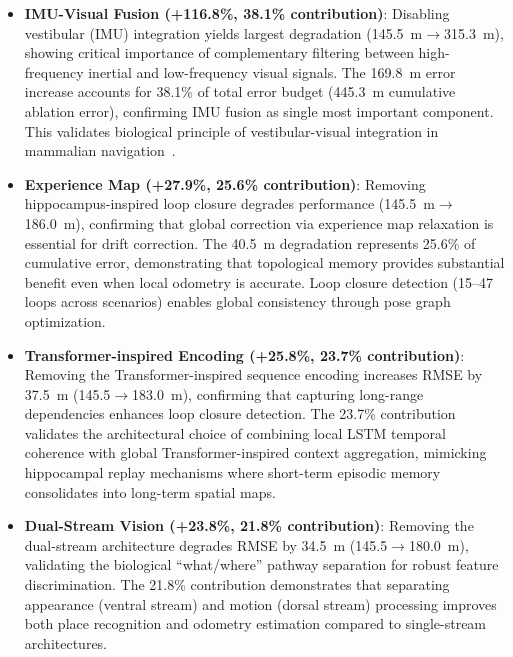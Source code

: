 \begin{itemize}
    \item \textbf{IMU-Visual Fusion (+116.8\%, 38.1\% con\-tri\-bu\-tion)}: Disabling ves\-tib\-u\-lar (IMU) integration yields largest deg\-ra\-da\-tion (145.5~m$\rightarrow$315.3~m), showing critical importance of comple\-mentary filtering between high-frequency inertial and low-frequency visual signals. The 169.8~m error increase accounts for 38.1\% of total error budget (445.3~m cumulative ablation error), confirming IMU fusion as single most important component. This validates biological principle of ves\-tib\-u\-lar-visual integration in mammalian navigation~\cite{Angelaki2008}.
    
    \item \textbf{Experience Map (+27.9\%, 25.6\% con\-tri\-bu\-tion)}: Removing hippo\-campus-inspired loop closure de\-grades per\-for\-mance (145.5~m$\rightarrow$186.0~m), confirming that global correction via experience map relaxation is essential for drift correction. The 40.5~m deg\-ra\-da\-tion represents 25.6\% of cumulative error, demonstrating that topological memory provides substantial benefit even when local odometry is accurate. Loop closure detection (15--47 loops across scenarios) enables global consistency through pose graph optimization.
    
    \item \textbf{Trans\-form\-er-in\-spired Encoding (+25.8\%, 23.7\% con\-tri\-bu\-tion)}: Removing the Trans\-former-inspired sequence encoding increases RMSE by 37.5~m (145.5$\rightarrow$183.0~m), confirming that capturing long-range depen\-dencies enhances loop closure detection. The 23.7\% con\-tri\-bu\-tion validates the archi\-tectural choice of combining local LSTM temporal coherence with global Trans\-form\-er-in\-spired context aggregation, mimicking hippo\-campal replay mechanisms where short-term episodic memory consolidates into long-term spatial maps.
    
    \item \textbf{Dual-Stream Vision (+23.8\%, 21.8\% con\-tri\-bu\-tion)}: Removing the dual-stream archi\-tecture de\-grades RMSE by 34.5~m (145.5$\rightarrow$180.0~m), validating the biological ``what/where'' pathway separation for robust feature discrim\-ination. The 21.8\% con\-tri\-bu\-tion demon\-strates that separating appearance (ventral stream) and motion (dorsal stream) processing improves both place recognition and odometry estimation compared to single-stream architectures.
\end{itemize}

